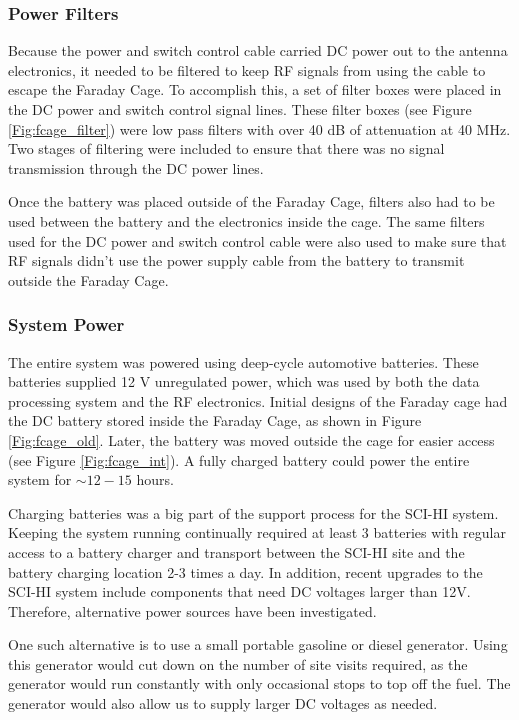 \subsubsection{Power Filters}
Because the power and switch control cable carried DC power out to the antenna electronics, it needed to be filtered to keep RF signals from using the cable to escape the Faraday Cage. To accomplish this, a set of filter boxes were placed in the DC power and switch control signal lines. These filter boxes (see Figure \ref{Fig:fcage_filter}) were low pass filters with over 40 dB of attenuation at 40 MHz. Two stages of filtering were included to ensure that there was no signal transmission through the DC power lines. 

Once the battery was placed outside of the Faraday Cage, filters also had to be used between the battery and the electronics inside the cage. The same filters used for the DC power and switch control cable were also used to make sure that RF signals didn't use the power supply cable from the battery to transmit outside the Faraday Cage.  

\subsubsection{System Power} \label{Sec:sys_power}
The entire system was powered using deep-cycle automotive batteries. These batteries supplied 12 V unregulated power, which was used by both the data processing system and the RF electronics. Initial designs of the Faraday cage had the DC battery stored inside the Faraday Cage, as shown in Figure \ref{Fig:fcage_old}. Later, the battery was moved outside the cage for easier access (see Figure \ref{Fig:fcage_int}). A fully charged battery could power the entire system for $\sim12-15$ hours. 

Charging batteries was a big part of the support process for the SCI-HI system. Keeping the system running continually required at least 3 batteries with regular access to a battery charger and transport between the SCI-HI site and the battery charging location 2-3 times a day. In addition, recent upgrades to the SCI-HI system include components that need DC voltages larger than 12V. Therefore, alternative power sources have been investigated.

One such alternative is to use a small portable gasoline or diesel generator. Using this generator would cut down on the number of site visits required, as the generator would run constantly with only occasional stops to top off the fuel. The generator would also allow us to supply larger DC voltages as needed. 

